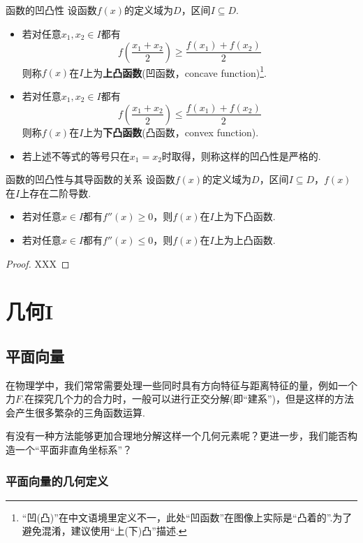 \documentclass[lang=cn, zihao=5]{elegantbook}
\newcommand{\ssb}[1]{\left( #1 \right)}
\begin{document}
\begin{definition}{函数的凹凸性}
	设函数$f(x)$的定义域为$D$，区间$I \subseteq D$.
	\begin{itemize}
		\item 若对任意$x_1,x_2 \in I$都有$$f\ssb{\frac{x_1+x_2}{2}} \geq \frac{f(x_1)+f(x_2)}{2}$$则称$f(x)$在$I$上为\textbf{上凸函数}(凹函数，concave function)\footnote{“凹(凸)”在中文语境里定义不一，此处“凹函数”在图像上实际是“凸着的”.为了避免混淆，建议使用“上(下)凸”描述.}.
		\item 若对任意$x_1,x_2 \in I$都有$$f\ssb{\frac{x_1+x_2}{2}} \leq \frac{f(x_1)+f(x_2)}{2}$$则称$f(x)$在$I$上为\textbf{下凸函数}(凸函数，convex function).
		\item 若上述不等式的等号只在$x_1=x_2$时取得，则称这样的凹凸性是严格的.
	\end{itemize}
\end{definition}

\begin{theorem}{函数的凹凸性与其导函数的关系}
	设函数$f(x)$的定义域为$D$，区间$I \subseteq D$，$f(x)$在$I$上存在二阶导数.
	\begin{itemize}
		\item 若对任意$x \in I$都有$f''(x) \geq 0$，则$f(x)$在$I$上为下凸函数.
		\item 若对任意$x \in I$都有$f''(x) \leq 0$，则$f(x)$在$I$上为上凸函数.
	\end{itemize}
\end{theorem}
\begin{proof}
	XXX
\end{proof}

\part{几何I}

\chapter{平面向量}

在物理学中，我们常常需要处理一些同时具有方向特征与距离特征的量，例如一个力$F$.在探究几个力的合力时，一般可以进行正交分解(即“建系”)，但是这样的方法会产生很多繁杂的三角函数运算.

有没有一种方法能够更加合理地分解这样一个几何元素呢？更进一步，我们能否构造一个“平面非直角坐标系”？

\section{平面向量的几何定义}
\end{document}
